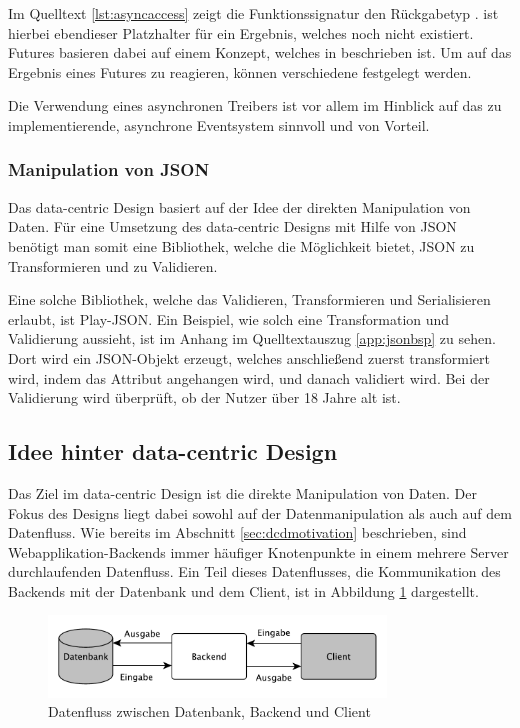 Im Quelltext \ref{lst:asyncaccess} zeigt die Funktionssignatur den Rückgabetyp .  ist hierbei ebendieser Platzhalter für ein Ergebnis, welches noch nicht existiert. Futures basieren dabei auf einem Konzept, welches in \cite{future-concept} beschrieben ist. Um auf das Ergebnis eines Futures zu reagieren, können verschiedene  festgelegt werden.

Die Verwendung eines asynchronen Treibers ist vor allem im Hinblick auf das zu implementierende, asynchrone \gls{Eventsystem} sinnvoll und von Vorteil. 

\subsubsection{Manipulation von JSON}
Das data-centric Design basiert auf der Idee der direkten Manipulation von Daten. Für eine Umsetzung des data-centric Designs mit Hilfe von JSON benötigt man somit eine Bibliothek, welche die Möglichkeit bietet, JSON zu Transformieren und zu Validieren.
 
Eine solche Bibliothek, welche das Validieren, Transformieren und Serialisieren erlaubt, ist Play-JSON. Ein Beispiel, wie solch eine Transformation und Validierung aussieht, ist im Anhang im Quelltextauszug \ref{app:jsonbsp} zu sehen. Dort wird ein JSON-Objekt erzeugt, welches anschließend zuerst transformiert wird, indem das Attribut  angehangen wird, und danach validiert wird. Bei der Validierung wird überprüft, ob der Nutzer über 18 Jahre alt ist.

\subsection{Idee hinter data-centric Design}
Das Ziel im data-centric Design ist die direkte Manipulation von Daten. Der Fokus des Designs liegt dabei sowohl auf der Datenmanipulation als auch auf dem Datenfluss. Wie bereits im Abschnitt \ref{sec:dcdmotivation} beschrieben, sind Webapplikation-\gls{Backend}s immer häufiger Knotenpunkte in einem mehrere Server durchlaufenden Datenfluss. Ein Teil dieses Datenflusses, die Kommunikation des \gls{Backend}s mit der Datenbank und dem Client, ist in Abbildung \ref{fig:dataflow} dargestellt. 

\begin{figure}[h]   
  \centering     
  \includegraphics[width=0.8\textwidth]{img/dataflow_dcd.pdf}  
   \caption{Datenfluss zwischen Datenbank, \gls{Backend} und Client}   
  \label{fig:dataflow} 
\end{figure}

